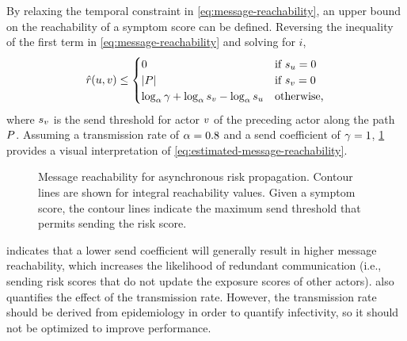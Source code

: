 By relaxing the temporal constraint in \cref{eq:message-reachability}, an upper bound on the reachability of a symptom score can be defined. Reversing the inequality of the first term in \cref{eq:message-reachability} and solving for $i$,
\begin{equation}\label{eq:estimated-message-reachability}
  \hat{r}(u, v) \leq \begin{cases} 
      0 & \text{if $s_u = 0$} \\
      \left\vert P \right\vert & \text{if $s_v = 0$} \\
      \log_{\alpha}\gamma + \log_{\alpha}s_v - \log_{\alpha}s_u & \text{otherwise,}
    \end{cases}
\end{equation}
where $s_v$ is the send threshold for actor $v$ of the preceding actor along the path $P$. Assuming a transmission rate of $\alpha = 0.8$ \citep{Hamner2020} and a send coefficient of $\gamma = 1$, \cref{fig:reach} provides a visual interpretation of \cref{eq:estimated-message-reachability}. 

\begin{figure}[htb]
\centering
{}
\caption[Message reachability for asynchronous risk propagation]{Message reachability for asynchronous risk propagation. Contour lines are shown for integral reachability values. Given a symptom score, the contour lines indicate the maximum send threshold that permits sending the risk score.}
\label{fig:reach}
\end{figure}

 indicates that a lower send coefficient will generally result in higher message reachability, which increases the likelihood of redundant communication (i.e., sending risk scores that do not update the exposure scores of other actors).  also quantifies the effect of the transmission rate. However, the transmission rate should be derived from epidemiology in order to quantify infectivity, so it should not be optimized to improve performance.

